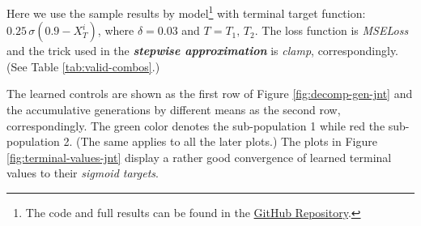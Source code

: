 \documentclass[a4paper,10pt]{article}
\newcommand{\1}{\mathbf{1}}
\begin{document}
Here we use the sample results by model\footnote{The code and full results can be found in the \href{https://github.com/OrangeAoo/PA-MFG-FBSDE/blob/FBSDE/2Period/Joint_Optim_2Prdx1/Adamax_clamp_sig_MSE.ipynb}{GitHub Repository}.} with terminal target function: $0.25\,\sigma{\left(0.9-X_T^i\right)}$, where $\delta=0.03$ and $T=T_1,\,T_2$. The loss function is \textit{MSELoss} and the trick used in the \textbf{\textit{stepwise approximation}} is \textit{clamp}, correspondingly. (See Table \ref{tab:valid-combos}.)

The learned controls are shown as the first row of Figure \ref{fig:decomp-gen-jnt} and the accumulative generations by different means as the second row, correspondingly. The green color denotes the sub-population 1 while red the sub-population 2. (The same applies to all the later plots.) 
The plots in Figure \ref{fig:terminal-values-jnt} display a rather good convergence of learned terminal values to their \textit{sigmoid targets}. 
\end{document}
